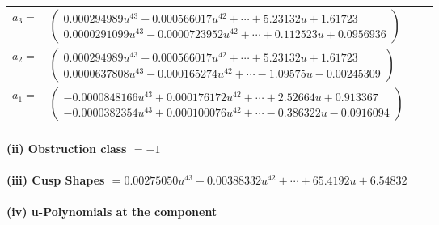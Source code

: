 \documentclass[1p]{elsarticle_modified}
\theoremstyle{definition}
\begin{document}
\begin{tabular}{m{7pt} m{180pt} m{7pt} m{180pt} }
\flushright $a_{3}=$&$\begin{pmatrix}0.000294989 u^{43}-0.000566017 u^{42}+\cdots+5.23132 u+1.61723\\0.0000291099 u^{43}-0.0000723952 u^{42}+\cdots+0.112523 u+0.0956936\end{pmatrix}$ \\
\flushright $a_{2}=$&$\begin{pmatrix}0.000294989 u^{43}-0.000566017 u^{42}+\cdots+5.23132 u+1.61723\\0.0000637808 u^{43}-0.000165274 u^{42}+\cdots-1.09575 u-0.00245309\end{pmatrix}$ \\
\flushright $a_{1}=$&$\begin{pmatrix}-0.0000848166 u^{43}+0.000176172 u^{42}+\cdots+2.52664 u+0.913367\\-0.0000382354 u^{43}+0.000100076 u^{42}+\cdots-0.386322 u-0.0916094\end{pmatrix}$\\&\end{tabular}
\flushleft \textbf{(ii) Obstruction class $= -1$}\\~\\
\flushleft \textbf{(iii) Cusp Shapes $= 0.00275050 u^{43}-0.00388332 u^{42}+\cdots+65.4192 u+6.54832$}\\~\\
\newpage\renewcommand{\arraystretch}{1}
\flushleft \textbf{(iv) u-Polynomials at the component}\newline \\
\end{document}
